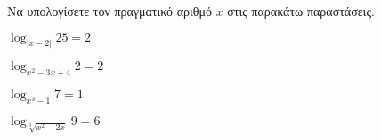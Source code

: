 Να υπολογίσετε τον πραγματικό αριθμό $ x $ στις παρακάτω παραστάσεις.
\begin{multicols}{2}
\begin{rlist}[leftmargin=5mm]
\item $ \log_{|x-2|}{25}=2 $
\item $ \log_{x^2-3x+4}{2}=2 $
\item $ \log_{x^3-1}{7}=1 $
\item $ \log_{\sqrt[3]{x^2-2x}}{9}=6 $
\end{rlist}
\end{multicols}
